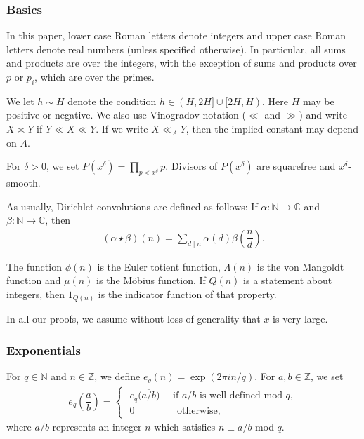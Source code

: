 \documentclass{amsart}
\numberwithin{equation}{section}
\begin{document}
\subsubsection{Basics} 

In this paper, lower case Roman letters denote integers and upper case Roman letters denote real numbers (unless specified otherwise). In particular, all sums and products are over the integers, with the exception of sums and products over $p$ or $p_i$, which are over the primes.

\vspace{3mm}

We let $h \sim H$  denote the condition $h \in (H, 2H] \cup [2H,H)$. Here $H$ may be positive or negative. We also use Vinogradov  notation ($\ll$ and $\gg$) and write $X \asymp Y$ if $Y \ll X \ll Y$. If we write $X \ll_A Y$, then the implied constant may depend on $A$. 



\vspace{3mm} For $\delta  > 0$, we set $P(x^\delta) = \prod_{p < x^\delta} p$. Divisors of $P(x^\delta)$ are squarefree and $x^\delta$-smooth.

\vspace{3mm}
As usually, Dirichlet convolutions are defined as follows: If $\alpha: \mathbb{N} \rightarrow \mathbb{C}$ and $\beta: \mathbb{N} \rightarrow \mathbb{C}$, then
\begin{align*}
(\alpha \star \beta)(n) = \sum_{d \mid n} \alpha(d) \beta\left(\dfrac{n}{d}\right).
\end{align*}

The function $\phi(n)$ is the Euler totient function, $\Lambda(n)$ is the von Mangoldt function and $\mu(n)$ is the M\"{o}bius function. If $Q(n)$ is a statement about integers, then  $1_{Q(n)}$ is the indicator function of that property. 

\vspace{3mm}  In all our proofs, we assume without loss of generality that   $x$ is very large.

\subsubsection{Exponentials}\label{sssec:exponentials} For $q \in \mathbb{N}$ and $n \in \mathbb{Z}$, we define $e_q(n) = \exp(2\pi i n/q)$. For $a, b \in \mathbb{Z}$, we set 
\begin{align*}
e_q\left(\dfrac{a}{b}\right) = \begin{cases} \,\,
e_q\big( \overline{a/b} \big) \quad \mbox{ if } a/b  \mbox{ is well-defined mod } q, \\ \,\, 0 \qquad\qquad\! \mbox{ otherwise,}
\end{cases}
\end{align*}
where $\overline{a/b}$ represents an integer $n$ which satisfies $n \equiv a/b$ mod $q$. \vspace{3mm}
\end{document}
